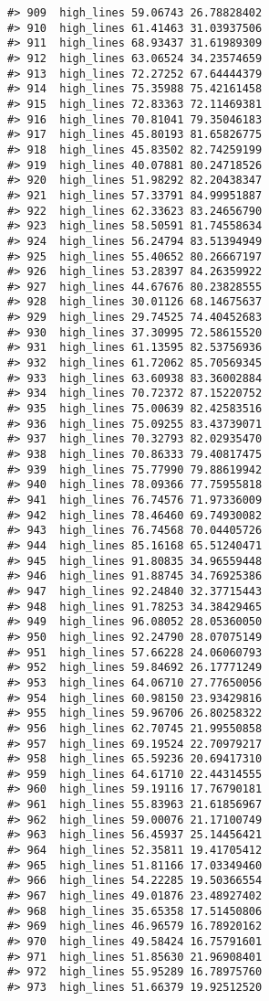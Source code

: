 \documentclass[
]{book}
\theoremstyle{definition}
\theoremstyle{definition}
\theoremstyle{definition}
\theoremstyle{definition}
\theoremstyle{remark}
\begin{document}
\begin{verbatim}
#> 909  high_lines 59.06743 26.78828402
#> 910  high_lines 61.41463 31.03937506
#> 911  high_lines 68.93437 31.61989309
#> 912  high_lines 63.06524 34.23574659
#> 913  high_lines 72.27252 67.64444379
#> 914  high_lines 75.35988 75.42161458
#> 915  high_lines 72.83363 72.11469381
#> 916  high_lines 70.81041 79.35046183
#> 917  high_lines 45.80193 81.65826775
#> 918  high_lines 45.83502 82.74259199
#> 919  high_lines 40.07881 80.24718526
#> 920  high_lines 51.98292 82.20438347
#> 921  high_lines 57.33791 84.99951887
#> 922  high_lines 62.33623 83.24656790
#> 923  high_lines 58.50591 81.74558634
#> 924  high_lines 56.24794 83.51394949
#> 925  high_lines 55.40652 80.26667197
#> 926  high_lines 53.28397 84.26359922
#> 927  high_lines 44.67676 80.23828555
#> 928  high_lines 30.01126 68.14675637
#> 929  high_lines 29.74525 74.40452683
#> 930  high_lines 37.30995 72.58615520
#> 931  high_lines 61.13595 82.53756936
#> 932  high_lines 61.72062 85.70569345
#> 933  high_lines 63.60938 83.36002884
#> 934  high_lines 70.72372 87.15220752
#> 935  high_lines 75.00639 82.42583516
#> 936  high_lines 75.09255 83.43739071
#> 937  high_lines 70.32793 82.02935470
#> 938  high_lines 70.86333 79.40817475
#> 939  high_lines 75.77990 79.88619942
#> 940  high_lines 78.09366 77.75955818
#> 941  high_lines 76.74576 71.97336009
#> 942  high_lines 78.46460 69.74930082
#> 943  high_lines 76.74568 70.04405726
#> 944  high_lines 85.16168 65.51240471
#> 945  high_lines 91.80835 34.96559448
#> 946  high_lines 91.88745 34.76925386
#> 947  high_lines 92.24840 32.37715443
#> 948  high_lines 91.78253 34.38429465
#> 949  high_lines 96.08052 28.05360050
#> 950  high_lines 92.24790 28.07075149
#> 951  high_lines 57.66228 24.06060793
#> 952  high_lines 59.84692 26.17771249
#> 953  high_lines 64.06710 27.77650056
#> 954  high_lines 60.98150 23.93429816
#> 955  high_lines 59.96706 26.80258322
#> 956  high_lines 62.70745 21.99550858
#> 957  high_lines 69.19524 22.70979217
#> 958  high_lines 65.59236 20.69417310
#> 959  high_lines 64.61710 22.44314555
#> 960  high_lines 59.19116 17.76790181
#> 961  high_lines 55.83963 21.61856967
#> 962  high_lines 59.00076 21.17100749
#> 963  high_lines 56.45937 25.14456421
#> 964  high_lines 52.35811 19.41705412
#> 965  high_lines 51.81166 17.03349460
#> 966  high_lines 54.22285 19.50366554
#> 967  high_lines 49.01876 23.48927402
#> 968  high_lines 35.65358 17.51450806
#> 969  high_lines 46.96579 16.78920162
#> 970  high_lines 49.58424 16.75791601
#> 971  high_lines 51.85630 21.96908401
#> 972  high_lines 55.95289 16.78975760
#> 973  high_lines 51.66379 19.92512520

\end{verbatim}
\end{document}
